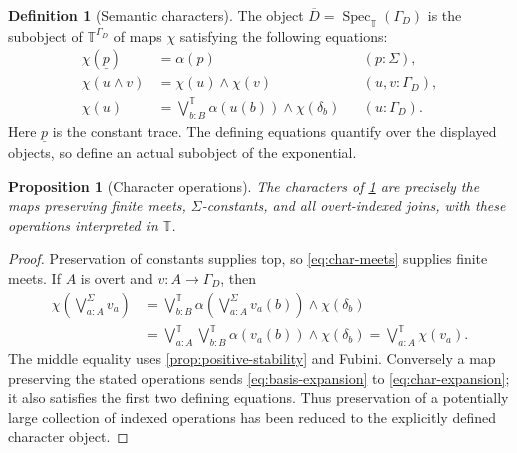 \documentclass[11pt,a4paper]{article}
\numberwithin{equation}{section}
\newtheorem{proposition}[proposition]{Proposition}
\theoremstyle{definition}
\newtheorem{definition}[definition]{Definition}
\theoremstyle{remark}
\theoremstyle{plain}
\newcommand{\TV}{\mathbb T}
\newcommand{\Spec}{\operatorname{Spec}}
\newcommand{\joinT}{\bigvee^{\TV}}
\begin{document}
\begin{definition}[Semantic characters]
\label{def:semantic-spectrum}
The object $\overline D=\Spec_{\TV}(\Gamma_D)$ is the subobject of
$\TV^{\Gamma_D}$ of maps $\chi$ satisfying the following equations:
\begin{align}
 \chi(\underline p)&=\alpha(p) &&(p:\Sigma),
 \label{eq:char-constants}\\
 \chi(u\wedge v)&=\chi(u)\wedge\chi(v) &&(u,v:\Gamma_D),
 \label{eq:char-meets}\\
 \chi(u)&=\joinT_{b:B}\alpha(u(b))\wedge\chi(\delta_b)
 &&(u:\Gamma_D).
 \label{eq:char-expansion}
\end{align}
Here $\underline p$ is the constant trace. The defining equations
quantify over the displayed objects, so define an actual subobject of
the exponential.
\end{definition}

\begin{proposition}[Character operations]
\label{prop:character-operations}
The characters of \cref{def:semantic-spectrum} are precisely the maps
preserving finite meets, $\Sigma$-constants, and all overt-indexed joins,
with these operations interpreted in $\TV$.
\end{proposition}
\begin{proof}
Preservation of constants supplies top, so
\eqref{eq:char-meets} supplies finite meets. If $A$ is overt and
$v:A\to\Gamma_D$, then
\begin{align*}
 \chi\left(\bigvee_{a:A}^{\Sigma}v_a\right)
 &=\joinT_{b:B}
   \alpha\left(\bigvee_{a:A}^{\Sigma}v_a(b)\right)
   \wedge\chi(\delta_b)\\
 &=\joinT_{a:A}\joinT_{b:B}
   \alpha(v_a(b))\wedge\chi(\delta_b)
 =\joinT_{a:A}\chi(v_a).
\end{align*}
The middle equality uses \cref{prop:positive-stability} and Fubini.
Conversely a map preserving the stated operations sends
\eqref{eq:basis-expansion} to \eqref{eq:char-expansion}; it also
satisfies the first two defining equations. Thus preservation of a
potentially large collection of indexed operations has been reduced
to the explicitly defined character object.
\end{proof}
\end{document}
